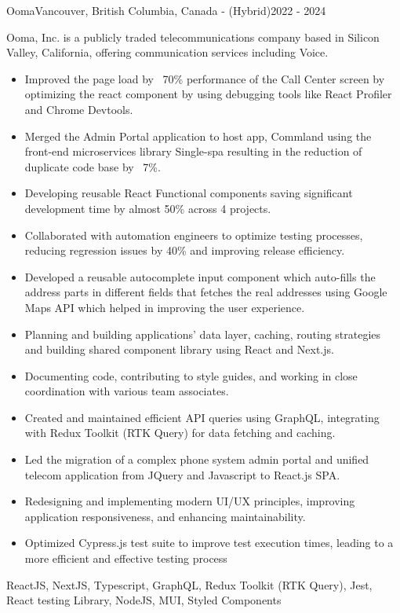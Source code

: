 \begin{projects}
    \project
    {Ooma}{Vancouver, British Columbia, Canada - (Hybrid)}{2022 - 2024}
    {}
    {Ooma, Inc. is a publicly traded telecommunications company based in Silicon Valley, California, offering communication services including Voice.
    \begin{itemize}
        \item Improved the page load by ~70\% performance of the Call Center screen by optimizing the react component by using debugging tools like React Profiler and Chrome Devtools.
        \item Merged the Admin Portal application to host app, Commland using the front-end microservices library Single-spa resulting in the reduction of duplicate code base by ~7\%.
        \item Developing reusable React Functional components saving significant development time by almost 50\% across 4 projects.
        \item Collaborated with automation engineers to optimize testing processes, reducing regression issues by 40\% and improving release efficiency.
        \item Developed a reusable autocomplete input component which auto-fills the address parts in different fields that fetches the real addresses using Google Maps API which helped in improving the user experience.
        \item Planning and building applications' data layer, caching, routing strategies and building shared component library using React and Next.js.
        \item Documenting code, contributing to style guides, and working in close coordination with various team associates.
        \item Created and maintained efficient API queries using GraphQL, integrating with Redux Toolkit (RTK Query) for data fetching and caching.
        \item Led the migration of a complex phone system admin portal and unified telecom application from JQuery and Javascript to React.js SPA.
        \item Redesigning and implementing modern UI/UX principles, improving application responsiveness, and enhancing maintainability.
        \item Optimized Cypress.js test suite to improve test execution times, leading to a more efficient and effective testing process
    \end{itemize}}
    {ReactJS, NextJS, Typescript, GraphQL, Redux Toolkit (RTK Query), Jest, React testing Library, NodeJS, MUI, Styled Components}


\end{projects}
